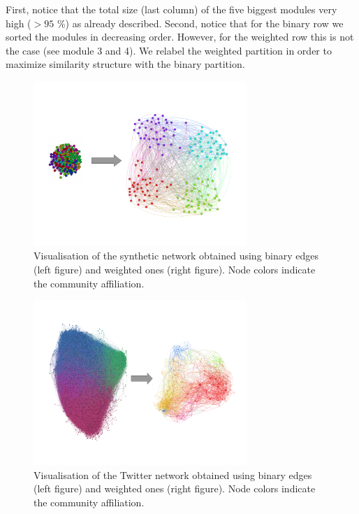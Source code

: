 \documentclass[12pt]{article}
\begin{document}
First, notice that the total size (last column) of the five biggest modules very high ($>95$ \%) as already described. Second, notice
that for the binary row we sorted the modules in decreasing order.
However, for the weighted row this is not the case (see module 3 and 4).
We relabel the weighted partition in order to maximize similarity
structure with the binary partition.

\begin{figure}[!ht]
\centering
\includegraphics[width=0.72\textwidth]{Figures/synthetic_data_networks.pdf}
\caption{Visualisation of the synthetic network obtained using binary edges (left figure) and weighted ones (right figure). Node colors indicate the
community affiliation.}
\label{networks_synthetic}
\end{figure}

\begin{figure}[!ht]
\centering
\includegraphics[width=0.72\textwidth]{Figures/twitter_data_networks.pdf}
\caption{Visualisation of the Twitter network obtained using binary edges (left figure) and weighted ones (right figure). Node colors indicate the
community affiliation.}
\label{networks_twitter}
\end{figure}
\end{document}
